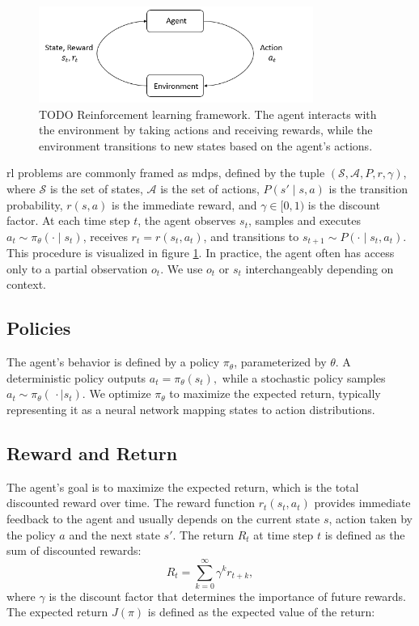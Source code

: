 \begin{figure}
\centering
\includegraphics[width=0.8\textwidth]{images/rl_diagram.png}
\caption[Reinforcement learning framework]{TODO   Reinforcement learning framework. The agent interacts with the environment by taking actions and receiving rewards, while the environment transitions to new states based on the agent's actions.}
\label{fig:rl_diagram}
\end{figure}
\gls{rl} problems are commonly framed as \gls{mdp}s, defined by the tuple \((\mathcal{S}, \mathcal{A}, P, r, \gamma)\), where \(\mathcal{S}\) is the set of states, \(\mathcal{A}\) is the set of actions, \(P(s'\!\mid\!s,a)\) is the transition probability, \(r(s,a)\) is the immediate reward, and \(\gamma \in [0,1)\) is the discount factor. At each time step \(t\), the agent observes \(s_t\), samples and executes \(a_t \sim \pi_\theta(\cdot\mid s_t)\), receives \(r_t = r(s_t,a_t)\), and transitions to \(s_{t+1} \sim P(\cdot\mid s_t,a_t)\). This procedure is visualized in figure \ref{fig:rl_diagram}. In practice, the agent often has access only to a partial observation \(o_t\). We use \(o_t\) or \(s_t\) interchangeably depending on context.

\subsection{Policies}
The agent's behavior is defined by a policy \(\pi_\theta\), parameterized by \(\theta\). A deterministic policy outputs
$ 
a_t = \pi_{\theta}(s_t),
$
while a stochastic policy samples
$
a_t \sim \pi_{\theta}(\,\cdot\mid s_t).
$
We optimize \(\pi_\theta\) to maximize the expected return, typically representing it as a neural network mapping states to action distributions.

\subsection{Reward and Return}
The agent's goal is to maximize the expected return, which is the total discounted reward over time. 
The reward function \(r_t(s_t,a_t)\) provides immediate feedback to the agent and usually depends on the current state \(s\), action taken by the policy \(a\) and the next state \(s'\). The return \(R_t\) at time step \(t\) is defined as the sum of discounted rewards:
\[
R_t = \sum_{k=0}^{\infty} \gamma^k r_{t+k},
\]
where \(\gamma\) is the discount factor that determines the importance of future rewards. The expected return \(J(\pi)\) is defined as the expected value of the return:

